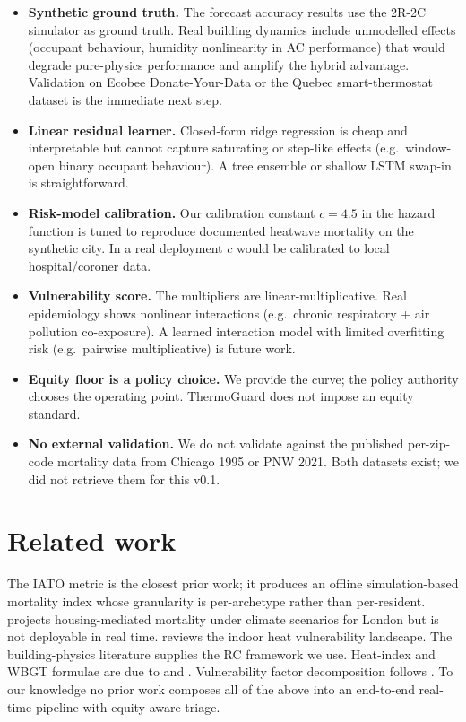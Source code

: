 \documentclass[11pt]{article}
\begin{document}
\begin{itemize}[leftmargin=2em]
\item \textbf{Synthetic ground truth.}  The forecast accuracy results use the 2R-2C simulator as ground truth.  Real building dynamics include unmodelled effects (occupant behaviour, humidity nonlinearity in AC performance) that would degrade pure-physics performance and amplify the hybrid advantage.  Validation on Ecobee Donate-Your-Data or the Quebec smart-thermostat dataset is the immediate next step.
\item \textbf{Linear residual learner.}  Closed-form ridge regression is cheap and interpretable but cannot capture saturating or step-like effects (e.g.\ window-open binary occupant behaviour).  A tree ensemble or shallow LSTM swap-in is straightforward.
\item \textbf{Risk-model calibration.}  Our calibration constant $c = 4.5$ in the hazard function is tuned to reproduce documented heatwave mortality on the synthetic city.  In a real deployment $c$ would be calibrated to local hospital/coroner data.
\item \textbf{Vulnerability score.}  The multipliers are linear-multiplicative.  Real epidemiology shows nonlinear interactions (e.g.\ chronic respiratory + air pollution co-exposure).  A learned interaction model with limited overfitting risk (e.g.\ pairwise multiplicative) is future work.
\item \textbf{Equity floor is a policy choice.}  We provide the curve; the policy authority chooses the operating point.  ThermoGuard does not impose an equity standard.
\item \textbf{No external validation.}  We do not validate against the published per-zip-code mortality data from Chicago 1995 or PNW 2021.  Both datasets exist; we did not retrieve them for this v0.1.
\end{itemize}

\section{Related work}

The IATO metric \citep{iato2025} is the closest prior work; it produces an offline simulation-based mortality index whose granularity is per-archetype rather than per-resident.  \citet{taylor2018london} projects housing-mediated mortality under climate scenarios for London but is not deployable in real time.  \citet{indoorvulnerability2025} reviews the indoor heat vulnerability landscape.  The building-physics literature \citep{reynders2014grey} supplies the RC framework we use.  Heat-index and WBGT formulae are due to \citet{steadman1979heatindex} and \citet{stull2011wetbulb}.  Vulnerability factor decomposition follows \citet{bouchama2007isolation, gronlund2014vulnerability, astrom2011elderly}.  To our knowledge no prior work composes all of the above into an end-to-end real-time pipeline with equity-aware triage.
\end{document}
